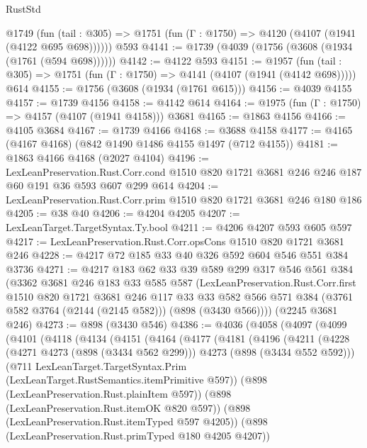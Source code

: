 \begin{lexlean}{RustStd}
\begin{coremodule}
    @1749 (fun (tail : @305) => @1751 (fun (Γ : @1750) => @4120 (@4107 (@1941 (@4122 @695 @698))))))
    @593
@4141 := @1739 (@4039 (@1756 (@3608 (@1934 (@1761 (@594 @698))))))
@4142 := @4122 @593
@4151 := @1957
    (fun (tail : @305) => @1751 (fun (Γ : @1750) => @4141 (@4107 (@1941 (@4142 @698)))))
    @614
@4155 := @1756 (@3608 (@1934 (@1761 @615)))
@4156 := @4039 @4155
@4157 := @1739 @4156
@4158 := @4142 @614
@4164 := @1975 (fun (Γ : @1750) => @4157 (@4107 (@1941 @4158))) @3681
@4165 := @1863 @4156
@4166 := @4105 @3684
@4167 := @1739 @4166
@4168 := @3688 @4158
@4177 := @4165 (@4167 @4168) (@842 @1490 @1486 @4155 @1497 (@712 @4155))
@4181 := @1863 @4166 @4168 (@2027 @4104)
@4196 := LexLeanPreservation.Rust.Corr.cond
    @1510
    @820
    @1721
    @3681
    @246
    @246
    @187
    @60
    @191
    @36
    @593
    @607
    @299
    @614
@4204 := LexLeanPreservation.Rust.Corr.prim @1510 @820 @1721 @3681 @246 @180 @186
@4205 := @38 @40
@4206 := @4204 @4205
@4207 := LexLeanTarget.TargetSyntax.Ty.bool
@4211 := @4206 @4207 @593 @605 @597
@4217 := LexLeanPreservation.Rust.Corr.opsCons @1510 @820 @1721 @3681 @246
@4228 := @4217 @72 @185 @33 @40 @326 @592 @604 @546 @551 @384 @3736
@4271 := @4217
    @183
    @62
    @33
    @39
    @589
    @299
    @317
    @546
    @561
    @384
    (@3362
      @3681
      @246
      @183
      @33
      @585
      @587
      (LexLeanPreservation.Rust.Corr.first
        @1510
        @820
        @1721
        @3681
        @246
        @117
        @33
        @33
        @582
        @566
        @571
        @384
        (@3761 @582 @3764 (@2144 (@2145 @582)))
        (@898 (@3430 @566))))
    (@2245 @3681 @246)
@4273 := @898 (@3430 @546)
@4386 := @4036
    (@4058
      (@4097
        (@4099
          (@4101
            (@4118
              (@4134
                (@4151
                  (@4164
                    (@4177
                      (@4181
                        (@4196
                          (@4211
                            (@4228
                              (@4271 @4273 (@898 (@3434 @562 @299)))
                              @4273
                              (@898 (@3434 @552 @592)))
                            (@711
                              LexLeanTarget.TargetSyntax.Prim
                              (LexLeanTarget.RustSemantics.itemPrimitive @597))
                            (@898 (LexLeanPreservation.Rust.plainItem @597))
                            (@898 (LexLeanPreservation.Rust.itemOK @820 @597))
                            (@898 (LexLeanPreservation.Rust.itemTyped @597 @4205))
                            (@898 (LexLeanPreservation.Rust.primTyped @180 @4205 @4207))

\end{coremodule}
\end{lexlean}
